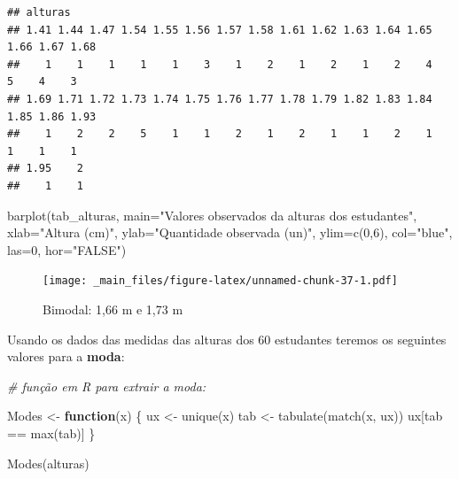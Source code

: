 \documentclass[
]{book}
\newenvironment{Shaded}{\begin{snugshade}}{\end{snugshade}}
\newcommand{\AttributeTok}[1]{\textcolor[rgb]{0.77,0.63,0.00}{#1}}
\newcommand{\CommentTok}[1]{\textcolor[rgb]{0.56,0.35,0.01}{\textit{#1}}}
\newcommand{\ControlFlowTok}[1]{\textcolor[rgb]{0.13,0.29,0.53}{\textbf{#1}}}
\newcommand{\DecValTok}[1]{\textcolor[rgb]{0.00,0.00,0.81}{#1}}
\newcommand{\FunctionTok}[1]{\textcolor[rgb]{0.00,0.00,0.00}{#1}}
\newcommand{\NormalTok}[1]{#1}
\newcommand{\OtherTok}[1]{\textcolor[rgb]{0.56,0.35,0.01}{#1}}
\newcommand{\SpecialCharTok}[1]{\textcolor[rgb]{0.00,0.00,0.00}{#1}}
\newcommand{\StringTok}[1]{\textcolor[rgb]{0.31,0.60,0.02}{#1}}
\begin{document}
\begin{verbatim}
## alturas
## 1.41 1.44 1.47 1.54 1.55 1.56 1.57 1.58 1.61 1.62 1.63 1.64 1.65 1.66 1.67 1.68 
##    1    1    1    1    1    3    1    2    1    2    1    2    4    5    4    3 
## 1.69 1.71 1.72 1.73 1.74 1.75 1.76 1.77 1.78 1.79 1.82 1.83 1.84 1.85 1.86 1.93 
##    1    2    2    5    1    1    2    1    2    1    1    2    1    1    1    1 
## 1.95    2 
##    1    1
\end{verbatim}

\begin{Shaded}
\begin{Highlighting}[]
\FunctionTok{barplot}\NormalTok{(tab\_alturas,}
        \AttributeTok{main=}\StringTok{"Valores observados da alturas dos estudantes"}\NormalTok{,}
        \AttributeTok{xlab=}\StringTok{"Altura (cm)"}\NormalTok{,}
        \AttributeTok{ylab=}\StringTok{"Quantidade observada (un)"}\NormalTok{,}
        \AttributeTok{ylim=}\FunctionTok{c}\NormalTok{(}\DecValTok{0}\NormalTok{,}\DecValTok{6}\NormalTok{),}
        \AttributeTok{col=}\StringTok{"blue"}\NormalTok{,}
        \AttributeTok{las=}\DecValTok{0}\NormalTok{, }
        \AttributeTok{hor=}\StringTok{"FALSE"}\NormalTok{)}
\end{Highlighting}
\end{Shaded}

\begin{figure}
\centering
\texttt{[image: \_main\_files/figure-latex/unnamed-chunk-37-1.pdf]}
\caption{\label{fig:unnamed-chunk-37}Bimodal: 1,66 m e 1,73 m}
\end{figure}

Usando os dados das medidas das alturas dos 60 estudantes teremos os seguintes valores para a \textbf{moda}:

\begin{Shaded}
\begin{Highlighting}[]
\CommentTok{\# função em R para extrair a moda:}

\NormalTok{Modes }\OtherTok{\textless{}{-}} \ControlFlowTok{function}\NormalTok{(x) \{}
\NormalTok{  ux }\OtherTok{\textless{}{-}} \FunctionTok{unique}\NormalTok{(x)}
\NormalTok{  tab }\OtherTok{\textless{}{-}} \FunctionTok{tabulate}\NormalTok{(}\FunctionTok{match}\NormalTok{(x, ux))}
\NormalTok{  ux[tab }\SpecialCharTok{==} \FunctionTok{max}\NormalTok{(tab)]}
\NormalTok{\}}

\FunctionTok{Modes}\NormalTok{(alturas)}
\end{Highlighting}
\end{Shaded}
\end{document}
